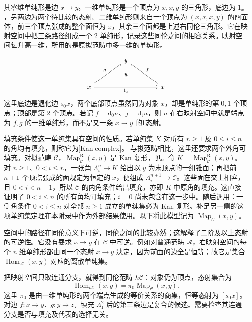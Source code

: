 其零维单纯形是边 \(x\rightarrow y\)。一维单纯形是一个顶点为 \(x,x,y\) 的三角形，底边为 \(1_x\)，另两边为两个待比较的态射。二维单纯形则来自一个顶点为 \((x,x,x,y)\) 的四面体，前三个顶点张成的整个面恒为 \(x\)，其余三个面都是上述右同伦三角形。它在映射空间中把三条路径组成一个 2 单纯形，记录这些同伦之间的相容关系。映射空间每升高一维，所用的是原拟范畴中多一维的单纯形。

\[
	\begin{tikzcd}[column sep=4em,row sep=2.6em]
		&y\arrow[d,phantom,"u" description]&\\
		x\arrow[ur,"g"]\arrow[rr,"1_x"']&\phantom{x}&x\arrow[ul,"f"']
	\end{tikzcd}
\]
这里底边是退化边 \(s_0x\)，两个底部顶点虽然同为对象 \(x\)，却是单纯形的第 \(0,1\) 个顶点；顶部是第 \(2\) 个顶点。若记 \(f=\mathrm d_0u\)、\(g=\mathrm d_1u\)，则 \(u\) 在右映射空间中就是端点为 \(f,g\) 的一维单纯形，而不是又一条 \(x\to y\) 的1态射。

\ProseParagraphBreak
填充条件使这一单纯集具有空间的性质。若单纯集 \(K\) 对所有 \(n\ge1\) 及 \(0\le i\le n\) 的角均有填充，则称它为[Kan complex]。 与拟范畴相比，这里还要求两个外角可填充。对拟范畴 \(\mathcal C\)，\(\operatorname{Map}_{\mathcal C}^{\mathrm R}(x,y)\) 是 Kan 复形，见\cite[Proposition 1.2.2.3]{Lurie2009HigherToposTheory}。令 \(K=\operatorname{Map}_{\mathcal C}^{\mathrm R}(x,y)\)。对 \(n\ge1\)、\(0<i\le n\)，一张角 \(\Lambda_i^n\rightarrow K\) 给出以 \(y\) 为末顶点的一组锥面；再把前 \(n+1\) 个顶点张成的面规定为恒定的 \(x\)，便组成 \(\Lambda_i^{n+1}\rightarrow\mathcal C\)。这些面在交上相容，且 \(0<i<n+1\)，所以 \(\mathcal C\) 的内角条件给出填充，亦即 \(K\) 中原角的填充。这直接证明了 \(0<i\le n\) 的所有角均可填充；\(i=0\) 尚未包含在这一步中。随后调用\cite[Proposition 1.2.5.1]{Lurie2009HigherToposTheory}：一侧角条件 \(0<i\le n\) 对全部 \(n\ge1\) 成立的单纯集必为 Kan 复形。补足另一侧的这项单纯集定理在本附录中作为外部结果使用。以下将此模型记为 \(\operatorname{Map}_{\mathcal C}(x,y)\)。

\ProseParagraphBreak
空间中的路径在同伦意义下可逆，同伦之间的比较亦然；这解释了二阶及以上态射的可逆性。它没有要求 \(x\rightarrow y\) 在 \(\mathcal C\) 中可逆。例如对普通范畴 \(\mathcal A\)，右映射空间的每个 \(n\) 维单纯形都由同一个态射 \(x\rightarrow y\) 决定，因为前面的边全是恒等；故它是集合 \(\operatorname{Hom}_{\mathcal A}(x,y)\) 对应的离散单纯集。

\ProseParagraphBreak
把映射空间只取连通分支，就得到同伦范畴 \(h\mathcal C\)：对象仍为顶点，态射集合为
\[
	\operatorname{Hom}_{h\mathcal C}(x,y) =\pi_0\operatorname{Map}_{\mathcal C}(x,y).
\]
这里 \(\pi_0\) 是由一维单纯形的两个端点生成的等价关系的商集，恒等态射为 \([s_0x]\)。对边 \(f:x\rightarrow y\)、\(g:y\rightarrow z\)，填充 \(\Lambda_1^2\) 后的第三条边是复合的候选。需要检查其连通分支是否与填充及代表的选择无关。

